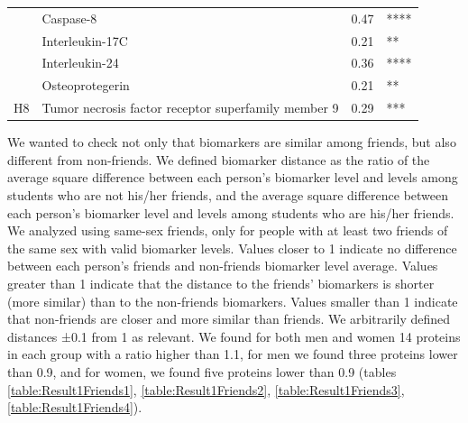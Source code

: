 \begin{table}[ht]
{\begin{tabular}{clll}
                                           & Caspase-8                                                                   & 0.47                               & ****                                    \\
                                           & Interleukin-17C                                                             & 0.21                               & **                                      \\
                                           & Interleukin-24                                                              & 0.36                               & ****                                    \\
                                           & \cellcolor[HTML]{EFEFEF}Osteoprotegerin                                     & \cellcolor[HTML]{EFEFEF}0.21       & \cellcolor[HTML]{EFEFEF}**              \\
\multirow{-6}{*}{H8}                       & \cellcolor[HTML]{EFEFEF}Tumor necrosis factor receptor superfamily member 9 & \cellcolor[HTML]{EFEFEF}0.29       & \cellcolor[HTML]{EFEFEF}***            
\end{tabular}
}

\label{table:Result1FemalesRegression}

\end{table}

We wanted to check not only that biomarkers are similar among friends, but also different from non-friends. We defined biomarker distance as the ratio of the average square difference between each person’s biomarker level and levels among students who are not his/her friends, and the average square difference between each person’s biomarker level and levels among students who are his/her friends. We analyzed using same-sex friends, only for people with at least two friends of the same sex with valid biomarker levels. Values closer to 1 indicate no difference between each person’s friends and non-friends biomarker level average. Values greater than 1 indicate that the distance to the friends’ biomarkers is shorter (more similar) than to the non-friends biomarkers. Values smaller than 1 indicate that non-friends are closer and more similar than friends. We arbitrarily defined distances ±0.1 from 1 as relevant. We found for both men and women 14 proteins in each group with a ratio higher than 1.1, for men we found three proteins lower than 0.9, and for women, we found five proteins lower than 0.9 (tables \ref{table:Result1Friends1}, \ref{table:Result1Friends2}, \ref{table:Result1Friends3}, \ref{table:Result1Friends4}). 

